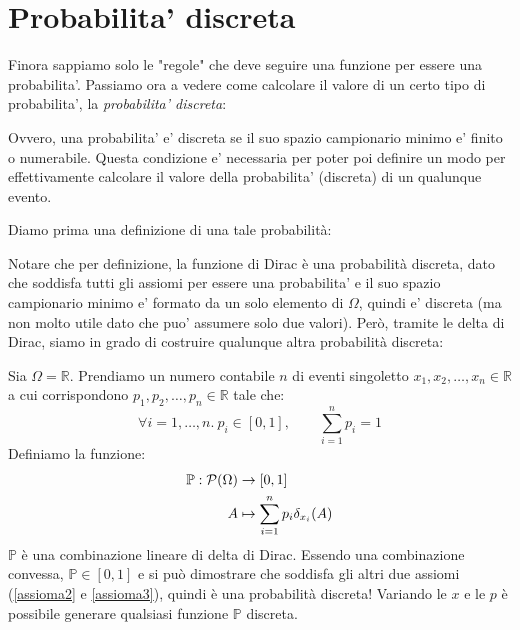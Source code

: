 \section{Probabilita' discreta} \label{dfn:probDiscr}
Finora sappiamo solo le "regole" che deve seguire una funzione per essere una probabilita'. Passiamo ora a vedere come calcolare il valore di un certo tipo di probabilita', la \textit{probabilita' discreta}:

Ovvero, una probabilita' e' discreta se il suo spazio campionario minimo e' finito o numerabile. Questa condizione e' necessaria per poter poi definire un modo per effettivamente calcolare il valore della probabilita' (discreta) di un qualunque evento.

Diamo prima una definizione di una tale probabilità:

Notare che per definizione, la funzione di Dirac è una probabilità discreta, dato che soddisfa tutti gli assiomi per essere una probabilita' e il suo spazio campionario minimo e' formato da un solo elemento di $ \Omega $, quindi e' discreta (ma non molto utile dato che puo' assumere solo due valori). Però, tramite le delta di Dirac, siamo in grado di costruire qualunque altra probabilità discreta:

Sia \( \Omega = \mathbb{R} \). Prendiamo un numero contabile \( n \) di eventi singoletto \( x_1,x_2,\ldots,x_n \in \mathbb{R} \) a cui corrispondono \( p_1,p_2,\ldots,p_n \in \mathbb{R} \) tale che:
\[
 \forall i = 1,\ldots,n.\ p_i \in [0,1], \qquad  \sum_{i=1}^{n} p_i = 1 
\]
Definiamo la funzione:
\[
\begin{aligned}
  \mathbb{P}: \mathcal{P}(\Omega) &\to [0,1]\\
  A &\mapsto \sum_{i=1}^{n} p_i \delta_{x_i}(A)
\end{aligned}
\]
\( \mathbb{P} \) è una combinazione lineare di delta di Dirac. Essendo una combinazione convessa, \( \mathbb{P} \in [0,1] \) e si può dimostrare che soddisfa gli altri due assiomi (\ref{assioma2} e \ref{assioma3}), quindi è una probabilità discreta! Variando le \( x \) e le \( p \) è possibile generare qualsiasi funzione \( \mathbb{P} \) discreta.

